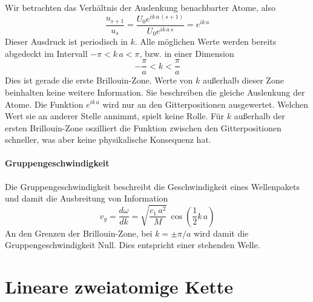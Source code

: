 Wir betrachten das Verhältnis der Auslenkung benachbarter Atome, also
\begin{equation}
 \frac{u_{s+1}}{u_s}  = 
 \frac{U_0 e^{i  k \, a \, (s+1) } } 
        {U_0 e^{i  k \, a \, s}} 
         = e^{i  k \, a }
\end{equation}
Dieser Ausdruck ist periodisch in $k$. Alle möglichen Werte werden bereits abgedeckt im Intervall $- \pi <  k \, a  < \pi$, bzw. in einer Dimension 
 \begin{equation}
 - \frac{\pi}{a} < k <  \frac{\pi}{a}
 \end{equation} 
Dies ist gerade die erste Brillouin-Zone. Werte von $k$ außerhalb dieser Zone beinhalten keine weitere Information. Sie beschreiben die gleiche Auslenkung der Atome. Die Funktion  $e^{i  k \, a }$ wird nur an den Gitterpositionen ausgewertet. Welchen Wert sie an anderer Stelle annimmt, spielt keine Rolle. Für $k$ außerhalb der ersten Brillouin-Zone oszilliert die Funktion zwischen den Gitterpositionen schneller, was aber keine physikalische Konsequenz hat.



\paragraph{Gruppengeschwindigkeit}
Die Gruppengeschwindigkeit beschreibt die Geschwindigkeit eines Wellenpakets und damit die Ausbreitung von Information
\begin{equation}
v_g = \frac{d \omega}{d k} =
 \sqrt{\frac{c_1 \, a^2}{M} } \, \cos 
 \left( \frac{1}{2}  k \, a \right)
\end{equation}
An den Grenzen der Brillouin-Zone, bei $k = \pm \pi / a$ wird damit die Gruppengeschwindigkeit Null. Dies entspricht einer stehenden Welle.






\section{Lineare zweiatomige Kette}

